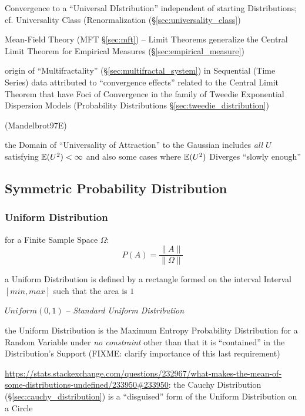 \fist Convergence to a ``Universal DIstribution'' independent of starting
Distributions; cf. Universality Class (Renormalization
(\S\ref{sec:universality_class})

\fist Mean-Field Theory (MFT \S\ref{sec:mft}) -- Limit Theorems generalize the
Central Limit Theorem for Empirical Measures (\S\ref{sec:empirical_measure})

\fist origin of ``Multifractality'' (\S\ref{sec:multifractal_system}) in
Sequential (Time Series) data attributed to ``convergence effects'' related to
the Central Limit Theorem that have Foci of Convergence in the family of Tweedie
Exponential Dispersion Models (Probability Distributions
\S\ref{sec:tweedie_distribution})

(Mandelbrot97E)

the Domain of ``Universality of Attraction'' to the Gaussian includes \emph{all}
$U$ satisfying $\mathbb{E}(U^2) < \infty$ and also some cases where $\mathbb{E}(U^2)$
Diverges ``slowly enough''



\subsection{Symmetric Probability Distribution}
\label{sec:symmetric_probability}

\subsubsection{Uniform Distribution}\label{sec:uniform_distribution}

for a Finite Sample Space $\Omega$:
\[
  P(A) = \frac{\|A\|}{\|\Omega\|}
\]

a Uniform Distribution is defined by a rectangle formed on the interval Interval
$[min,max]$ such that the area is $1$

$Uniform(0,1)$ -- \emph{Standard Uniform Distribution}

the Uniform Distribution is the Maximum Entropy Probability Distribution for a
Random Variable under \emph{no constraint} other than that it is ``contained''
in the Distribution's Support (FIXME: clarify importance of this last
requirement)

\url{https://stats.stackexchange.com/questions/232967/what-makes-the-mean-of-some-distributions-undefined/233950#233950}:
the Cauchy Distribution (\S\ref{sec:cauchy_distribution}) is a ``disguised''
form of the Uniform Distribution on a Circle



